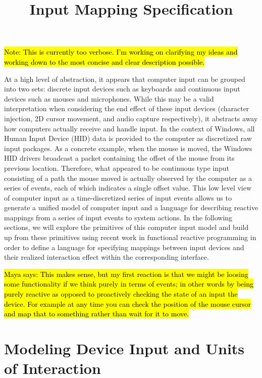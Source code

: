 \documentclass{article}
\title{Input Mapping Specification}
\begin{document}
\maketitle
\thispagestyle{firststyle}

\hl{Note: This is currently too verbose.
I'm working on clarifying my ideas and working down to the most concise and clear description possible.}

At a high level of abstraction, it appears that computer input can be grouped into two sets: discrete input devices such as keyboards and continuous input devices such as mouses and microphones.
While this may be a valid interpretation when considering the end effect of these input devices (character injection, 2D cursor movement, and audio capture respectively), it abstracts away how computers actually receive and handle input. In the context of Windows, all Human Input Device (HID) data is provided to the computer as discretized raw input packages. As a concrete example, when the mouse is moved, the Windows HID drivers broadcast a packet containing the offset of the mouse from its previous location. Therefore, what appeared to be continuous type input consisting of a path the mouse moved is actually observed by the computer as a series of events, each of which indicates a single offset value. This low level view of computer input as a time-discretized series of input events allows us to generate a unified model of computer input and a language for describing reactive mappings from a series of input events to system actions. In the following sections, we will explore the primitives of this computer input model and build up from these primitives using recent work in functional reactive programming in order to define a language for specifying mappings between input devices and their realized interaction effect within the corresponding interface.

\hl{\tiny Maya says: This makes sense, but my first reaction is that we might be loosing some functionality if we think purely in terms of events; in other words by being purely reactive as opposed to proactively checking the state of an input the device. For example at any time you can check the position of the mouse cursor and map that to something rather than wait for it to move.}

\section{Modeling Device Input and Units of Interaction}
\end{document}
